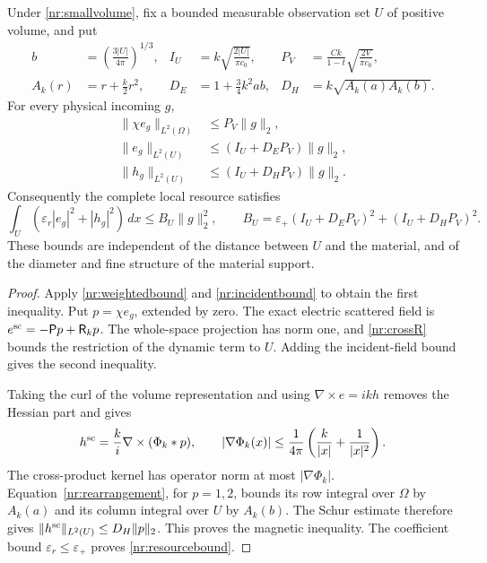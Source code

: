 \begin{theorem}
\label{nr:localresource}
Under \eqref{nr:smallvolume}, fix a bounded measurable observation set $U$
of positive volume, and put
\begin{equation}
 \begin{aligned}
 b&=\left(\frac{3|U|}{4\pi}\right)^{1/3},&
 I_U&=k\sqrt{\frac{2|U|}{\pi c_0}},&
 P_V&=\frac{Ck}{1-t}\sqrt{\frac{2V}{\pi c_0}},\\
 A_k(r)&=r+\frac{k}{2}r^2,&
 D_E&=1+\frac34 k^2ab,&
 D_H&=k\sqrt{A_k(a)A_k(b)}.
 \end{aligned}
 \label{nr:resourceconstants}
\end{equation}
For every physical incoming $g$,
\begin{equation}
 \begin{split}
 \|\chi e_g\|_{L^2(\Omega)}&\leq P_V\|g\|_2,\\
 \|e_g\|_{L^2(U)}&\leq(I_U+D_EP_V)\|g\|_2,\\
 \|h_g\|_{L^2(U)}&\leq(I_U+D_HP_V)\|g\|_2.
 \end{split}
 \label{nr:fieldbounds}
\end{equation}
Consequently the complete local resource satisfies
\begin{equation}
 \int_U(\varepsilon_r|e_g|^2+|h_g|^2)\,dx
 \leq B_U\|g\|_2^2,\qquad
 B_U=\varepsilon_+(I_U+D_EP_V)^2+(I_U+D_HP_V)^2.
 \label{nr:resourcebound}
\end{equation}
These bounds are independent of the distance between $U$ and the material,
and of the diameter and fine structure of the material support.
\end{theorem}
\begin{proof}
Apply \eqref{nr:weightedbound} and \eqref{nr:incidentbound} to obtain the
first inequality. Put $p=\chi e_g$, extended by zero. The exact electric
scattered field is $e^{\rm sc}=-\mathsf Pp+\mathsf R_kp$.
The whole-space projection has norm one, and \eqref{nr:crossR} bounds the
restriction of the dynamic term to $U$. Adding the incident-field bound
gives the second inequality.

Taking the curl of the volume representation and using
$\nabla\times e=ikh$ removes the Hessian part and gives
\begin{equation}
 h^{\rm sc}=\frac{k}{i}\nabla\times(\Phi_k*p),\qquad
 |\nabla\Phi_k(x)|\leq\frac1{4\pi}
                  \left(\frac{k}{|x|}+\frac1{|x|^2}\right).
 \label{nr:magnetickernel}
\end{equation}
The cross-product kernel has operator norm at most $|\nabla\Phi_k|$.
Equation~\eqref{nr:rearrangement}, for $p=1,2$, bounds its row integral
over $\Omega$ by $A_k(a)$ and its column integral over $U$ by $A_k(b)$.
The Schur estimate therefore gives
$\|h^{\rm sc}\|_{L^2(U)}\leq D_H\|p\|_2$.
This proves the magnetic inequality. The coefficient bound
$\varepsilon_r\leq\varepsilon_+$ proves \eqref{nr:resourcebound}.
\end{proof}

